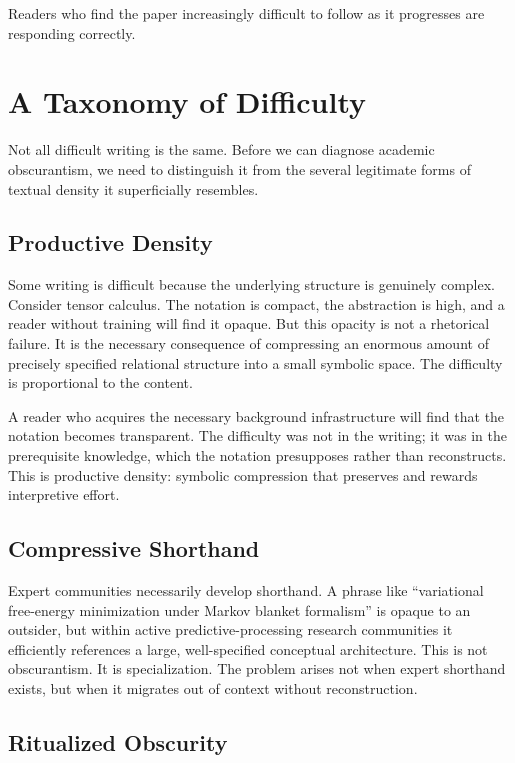 \documentclass[12pt, a4paper]{article}
\begin{document}
Readers who find the paper increasingly difficult to follow as it progresses are responding correctly.


\section{A Taxonomy of Difficulty}

Not all difficult writing is the same. Before we can diagnose academic obscurantism, we need to distinguish it from the several legitimate forms of textual density it superficially resembles.

\subsection{Productive Density}

Some writing is difficult because the underlying structure is genuinely complex. Consider tensor calculus. The notation is compact, the abstraction is high, and a reader without training will find it opaque. But this opacity is not a rhetorical failure. It is the necessary consequence of compressing an enormous amount of precisely specified relational structure into a small symbolic space. The difficulty is proportional to the content.

A reader who acquires the necessary background infrastructure will find that the notation becomes transparent. The difficulty was not in the writing; it was in the prerequisite knowledge, which the notation presupposes rather than reconstructs. This is productive density: symbolic compression that preserves and rewards interpretive effort.

\subsection{Compressive Shorthand}

Expert communities necessarily develop shorthand. A phrase like ``variational free-energy minimization under Markov blanket formalism'' is opaque to an outsider, but within active predictive-processing research communities it efficiently references a large, well-specified conceptual architecture. This is not obscurantism. It is specialization. The problem arises not when expert shorthand exists, but when it migrates out of context without reconstruction.

\subsection{Ritualized Obscurity}
\end{document}
